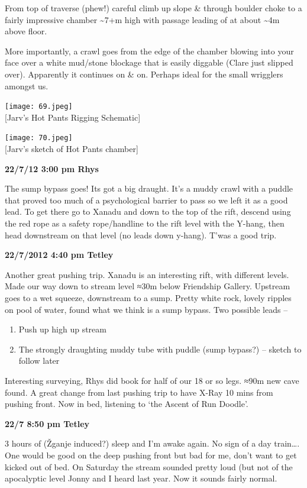 From top of traverse (phew!) careful climb up slope \& through boulder
choke to a fairly impressive chamber \textasciitilde{}7+m high with
passage leading of at about \textasciitilde{}4m above floor.

More importantly, a crawl goes from the edge of the chamber blowing into
your face over a white mud/stone blockage that is easily diggable (Clare
just slipped over). Apparently it continues on \& on. Perhaps ideal for
the small wrigglers amongst us.

\texttt{[image: 69.jpeg]}\\
{[}Jarv's Hot Pants Rigging Schematic{]}

\texttt{[image: 70.jpeg]}\\
{[}Jarv's sketch of Hot Pants chamber{]}

\textbf{22/7/12 3:00 pm Rhys}

The sump bypass goes! Its got a big draught. It's a muddy crawl with a
puddle that proved too much of a psychological barrier to pass so we
left it as a good lead. To get there go to Xanadu and down to the top of
the rift, descend using the red rope as a safety rope/handline to the
rift level with the Y-hang, then head downstream on that level (no leads
down y-hang). T'was a good trip.

\textbf{22/7/2012 4:40 pm Tetley}

Another great pushing trip. Xanadu is an interesting rift, with
different levels. Made our way down to stream level ≈30m below
Friendship Gallery. Upstream goes to a wet squeeze, downstream to a
sump. Pretty white rock, lovely ripples on pool of water, found what we
think is a sump bypass. Two possible leads --

\begin{enumerate}
\def\labelenumi{\arabic{enumi}.}
\tightlist
\item
  Push up high up stream
\item
  The strongly draughting muddy tube with puddle (sump bypass?) --
  sketch to follow later
\end{enumerate}

Interesting surveying, Rhys did book for half of our 18 or so legs. ≈90m
new cave found. A great change from last pushing trip to have X-Ray 10
mins from pushing front. Now in bed, listening to `the Ascent of Run
Doodle'.

\textbf{22/7 8:50 pm Tetley}

3 hours of (Žganje induced?) sleep and I'm awake again. No sign of a day
train\ldots{}. One would be good on the deep pushing front but bad for
me, don't want to get kicked out of bed. On Saturday the stream sounded
pretty loud (but not of the apocalyptic level Jonny and I heard last
year. Now it sounds fairly normal.

